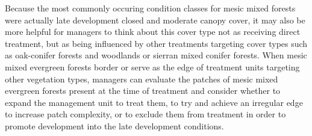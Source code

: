Because the most commonly occuring condition classes for mesic mixed forests were actually late development closed and moderate canopy cover, it may also be more helpful for managers to think about this cover type not as receiving direct treatment, but as being influenced by other treatments targeting cover types such as oak-conifer forests and woodlands or sierran mixed conifer forests. When mesic mixed evergreen forests border or serve as the edge of treatment units targeting other vegetation types, managers can evaluate the patches of mesic mixed evergreen forests present at the time of treatment and consider whether to expand the management unit to treat them, to try and achieve an irregular edge to increase patch complexity, or to exclude them from treatment in order to promote development into the late development conditions.                                                                                                                                                                                                                                                                                                                                                                                                                                                    












